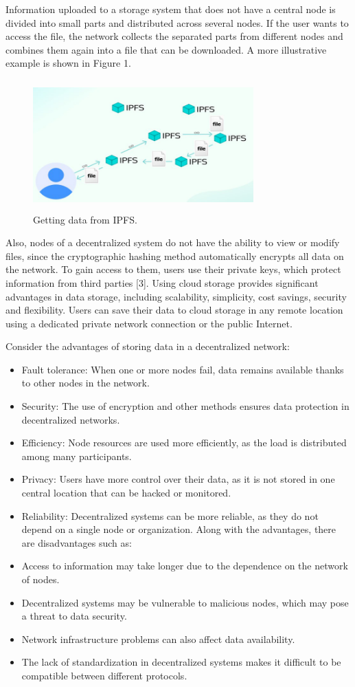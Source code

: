\documentclass[10pt,conference,a4paper]{IEEEtran_EDM}
\begin{document}
Information uploaded to a storage system that does not have a central node is divided into small parts and distributed across several nodes. If the user wants to access the file, the network collects the separated parts from different nodes and combines them again into a file that can be downloaded. A more illustrative example is shown in Figure 1.

\begin{figure}[htbp]
\includegraphics[width=8.5cm, height=5cm]{fig1.png}
\caption{Getting data from IPFS.}
\label{fig}
\end{figure}

Also, nodes of a decentralized system do not have the ability to view or modify files, since the cryptographic hashing method automatically encrypts all data on the network. To gain access to them, users use their private keys, which protect information from third parties [3].
Using cloud storage provides significant advantages in data storage, including scalability, simplicity, cost savings, security and flexibility. Users can save their data to cloud storage in any remote location using a dedicated private network connection or the public Internet.

Consider the advantages of storing data in a decentralized network:
\begin{itemize}
\item Fault tolerance: When one or more nodes fail, data remains available thanks to other nodes in the network.
\item Security: The use of encryption and other methods ensures data protection in decentralized networks.
\item Efficiency: Node resources are used more efficiently, as the load is distributed among many participants.
\item Privacy: Users have more control over their data, as it is not stored in one central location that can be hacked or monitored.
\item Reliability: Decentralized systems can be more reliable, as they do not depend on a single node or organization.
Along with the advantages, there are disadvantages such as:
\item Access to information may take longer due to the dependence on the network of nodes.
\item Decentralized systems may be vulnerable to malicious nodes, which may pose a threat to data security.
\item Network infrastructure problems can also affect data availability.
\item The lack of standardization in decentralized systems makes it difficult to be compatible between different protocols.
\end{itemize}
\end{document}
